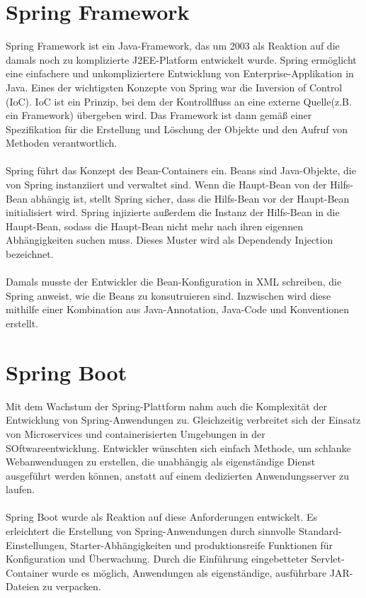 \documentclass[a4paper,12pt]{scrreprt}
\begin{document}
\section{Spring Framework}
Spring Framework ist ein Java-Framework, das um 2003 als Reaktion auf die damals noch zu komplizierte J2EE-Platform entwickelt wurde. Spring ermöglicht eine einfachere und unkompliziertere Entwicklung von Enterprise-Applikation in Java. Eines der wichtigsten Konzepte von Spring war die Inversion of Control (IoC).
IoC ist ein Prinzip, bei dem der Kontrollfluss an eine externe Quelle(z.B. ein Framework) übergeben wird. Das Framework ist dann gemäß einer Spezifikation für die Erstellung und Löschung der Objekte und den Aufruf von Methoden verantwortlich. \\ \\ Spring führt das Konzept des Bean-Containers ein. Beans sind Java-Objekte, die von Spring instanziiert und verwaltet sind. Wenn die Haupt-Bean von der Hilfs-Bean abhängig ist, stellt Spring sicher, dass die Hilfs-Bean vor der Haupt-Bean initialisiert wird. Spring injizierte außerdem die Instanz der Hilfs-Bean in die Haupt-Bean, sodass die Haupt-Bean nicht mehr nach ihren eigennen Abhängigkeiten suchen muss. Dieses Muster wird als Dependendy Injection bezeichnet.\\ \\
Damals musste der Entwickler die Bean-Konfiguration in XML schreiben, die Spring anweist, wie die Beans zu konsutruieren sind. Inzwischen wird diese mithilfe einer Kombination aus Java-Annotation, Java-Code und Konventionen erstellt.
\section{Spring Boot}
Mit dem Wachstum der Spring-Plattform nahm auch die Komplexität der Entwicklung von Spring-Anwendungen zu. Gleichzeitig verbreitet sich der Einsatz von Microservices und containerisierten Umgebungen in der SOftwareentwicklung. Entwickler wünschten sich einfach Methode, um schlanke Webanwendungen zu erstellen, die unabhängig als eigenständige Dienst ausgeführt werden können, anstatt auf einem dedizierten Anwendungsserver zu laufen.\\ \\
Spring Boot wurde als Reaktion auf diese Anforderungen entwickelt. Es erleichtert die Erstellung von Spring-Anwendungen durch sinnvolle Standard-Einstellungen, Starter-Abhängigkeiten und produktionsreife Funktionen für Konfiguration und Überwachung. Durch die Einführung eingebetteter Servlet-Container wurde es möglich, Anwendungen als eigenständige, ausführbare JAR-Dateien zu verpacken. 
\end{document}

